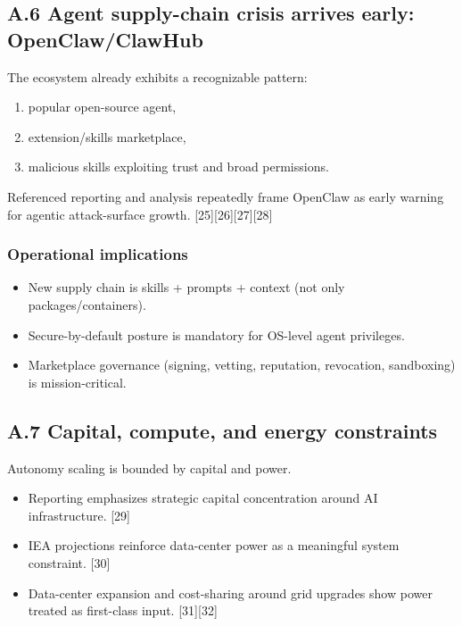 \documentclass[
]{article}
\providecommand{\tightlist}{%
  \setlength{\itemsep}{0pt}\setlength{\parskip}{0pt}}
\begin{document}
\hypertarget{a.6-agent-supply-chain-crisis-arrives-early-openclawclawhub}{%
\subsection{A.6 Agent supply-chain crisis arrives early:
OpenClaw/ClawHub}\label{a.6-agent-supply-chain-crisis-arrives-early-openclawclawhub}}

The ecosystem already exhibits a recognizable pattern:

\begin{enumerate}
\def\labelenumi{\arabic{enumi}.}
\tightlist
\item
  popular open-source agent,
\item
  extension/skills marketplace,
\item
  malicious skills exploiting trust and broad permissions.
\end{enumerate}

Referenced reporting and analysis repeatedly frame OpenClaw as early
warning for agentic attack-surface growth.
{[}25{]}{[}26{]}{[}27{]}{[}28{]}

\hypertarget{operational-implications-5}{%
\subsubsection{Operational
implications}\label{operational-implications-5}}

\begin{itemize}
\tightlist
\item
  New supply chain is skills + prompts + context (not only
  packages/containers).
\item
  Secure-by-default posture is mandatory for OS-level agent privileges.
\item
  Marketplace governance (signing, vetting, reputation, revocation,
  sandboxing) is mission-critical.
\end{itemize}

\hypertarget{a.7-capital-compute-and-energy-constraints}{%
\subsection{A.7 Capital, compute, and energy
constraints}\label{a.7-capital-compute-and-energy-constraints}}

Autonomy scaling is bounded by capital and power.

\begin{itemize}
\tightlist
\item
  Reporting emphasizes strategic capital concentration around AI
  infrastructure. {[}29{]}
\item
  IEA projections reinforce data-center power as a meaningful system
  constraint. {[}30{]}
\item
  Data-center expansion and cost-sharing around grid upgrades show power
  treated as first-class input. {[}31{]}{[}32{]}
\end{itemize}
\end{document}
